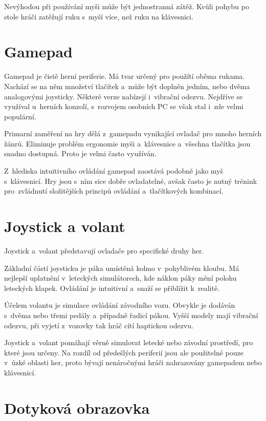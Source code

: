 \documentclass[thesis=B,czech,hidelinks]{FITthesis}[2012/06/26] %
\begin{document}
Nevýhodou při používání myši může být jednostranná zátěž. Kvůli pohybu po stole hráči zatěžují ruku s~myší více, než ruku na klávesnici.

\section{Gamepad}

Gamepad je čistě herní periferie. Má tvar určený pro použítí oběma rukama. Nachází se na něm množství tlačítek a~může být doplněn jedním, nebo dvěma analogovými joysticky. Některé verze nabízejí i~vibrační odezvu. Nejdříve se využíval u~herních konzolí, s~rozvojem osobních PC se však stal i~zde velmi populární.

Primarní zaměření na hry dělá z~gamepadu vynikající ovladač pro mnoho herních žánrů. Eliminuje problém ergonomie myši a~klávesnice a~všechna tlačítka jsou snadno dostupná. Proto je velmi často využíván.

Z~hlediska intuitivního ovládání gamepad zaostává podobně jako myš s~klávesnicí. Hry jsou s~ním sice dobře ovladatelné, avšak často je nutný trénink pro~zvládnutí složitějších principů ovládání a~tlačítkových kombinací.

\section{Joystick a volant}

Joystick a~volant představují ovladače pro specifické druhy her.

Základní částí joysticku je páka umístěná kolmo v~pohyblivém kloubu. Má nejlepší uplatnění v~leteckých simulátorech, kde náklon páky mění polohu leteckých klapek. Ovládání je intuitivní a~snaží se přiblížit k~realitě.

Účelem volantu je simulace ovládání závodního vozu. Obvykle je dodáván s~dvěma nebo třemi pedály a~případně řadicí pákou. Vyšší modely mají vibrační odezvu, při vyjetí z~vozovky tak hráč cítí haptickou odezvu.

Joystick a~volant pomáhají věrně simulovat letecké nebo závodní prostředí, pro které jsou určeny. Na rozdíl od předešlých periferií jsou ale použitelné pouze v~úzké oblasti her, proto bývají nenáročnými hráči nahrazovány gamepadem nebo klávesnicí.

\section{Dotyková obrazovka}
\end{document}
